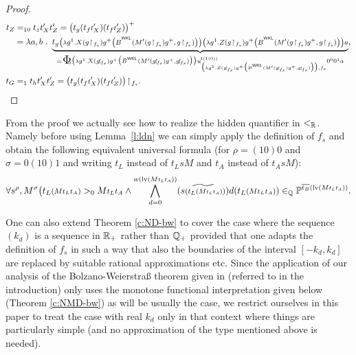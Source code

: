\begin{proof}
\begin{align*}
t_Z&=_{10} t_zt_{X}'t_{Z}'
	  =\big(t_g(t_f\args t_X')(t_f\args t_Z')\big)^+ \\
   &=\lambda a, b\ .\ \underbrace { t_g\args{
    	\big( \args \lambda g^1 . X     		
	(g\!\restriction\!{_{f_s}})
    	g^+
    	\big(B^{^\WKL}(M'(g\!\restriction\!{_{f_s}})g^+,g\!\restriction\!{_{f_s}})\big)	 \big)
    	\big( \args \lambda g^1 . Z 
        (g\!\restriction\!{_{f_s}})
    	g^+
    	\big(B^{^\WKL}(M'(g\!\restriction\!{_{f_s}})g^+,g\!\restriction\!{_{f_s}})\big)	 \big)
    	a} }_{=\xTWf
    	{\big( \args \lambda g^1 . X 
        (g\!\restriction\!{_{f_s}}) g^+
    	\big(B^{^\WKL}(M'(g\!\restriction\!{_{f_s}})g^+,g\!\restriction\!{_{f_s}})\big)	 \big)}
		  {\big( \args \lambda g^1 . Z 
        (g\!\restriction\!{_{f_s}})
    	g^+ \big(B^{^\WKL}(M'(g\!\restriction\!{_{f_s}})g^+,g\!\restriction\!{_{f_s}})\big)
        \big)}{f_s}a} ,\\
t_G &=_1t_ht_{X}'t_{Z}' 
     =\big(t_g(t_f\args t_X')(t_f\args t_Z')\big)\!\restriction\!{_{f_s}} . 
\end{align*} 
\end{proof}


\begin{remark}
From the proof we actually see how to realize the hidden quantifier in 
$<_{\mathbb{R}}$. Namely before using Lemma~\ref{l:ldn} we can simply 
apply the definition of $f_s$ and obtain
the following equivalent universal formula (for $\rho=(10)0$ and $\sigma=0(10)1$ 
and writing ${t_L}$ instead of $t_LsM$ and ${t_A}$ instead of $t_AsM$):
\[
\forall s^{\rho}, M^{\sigma}
  \big( {t_L}\args{(M\args{{t_L}{t_A}})}>_0 M\args{{t_L}{t_A}}\wedge\ 
  \!\!\bigwedge_{d=0}^{w(\l(M\args{{t_L}{t_A}}))}
         (\widetilde{s\args{({t_L}\args{(M\args{{t_L}{t_A}})})}})d({t_L}\args{(M\args{{t_L}{t_A}})})
         \in_\QQ \PP^{\overline{t_B}(\l(M\args{t_Lt_A}))}
\text{.}
\]
\end{remark}
\begin{remark} 
One can also extend Theorem \ref{c:ND-bw} to cover the case where the 
sequence $(k_d)$ is a sequence in $\mathbb{R}_+$ rather than $\mathbb{Q}_+$ provided that 
one adapts the definition of $f_s$ in such a way that also the boundaries 
of the interval $[-k_d,k_d]$ are replaced by suitable rational 
approximations etc. Since the application of our analysis of the 
Bolzano-Weierstra\ss{} theorem given in \cite{Kohlenbach(Browder)} (referred 
to in the introduction) only uses the monotone functional interpretation 
given below (Theorem \ref{c:NMD-bw}) as will be usually the case, 
we restrict ourselves in this paper to treat the case with 
real $k_d$ only in that context where things are particularly simple 
(and no approximation of the type mentioned above is needed). 
\end{remark}

